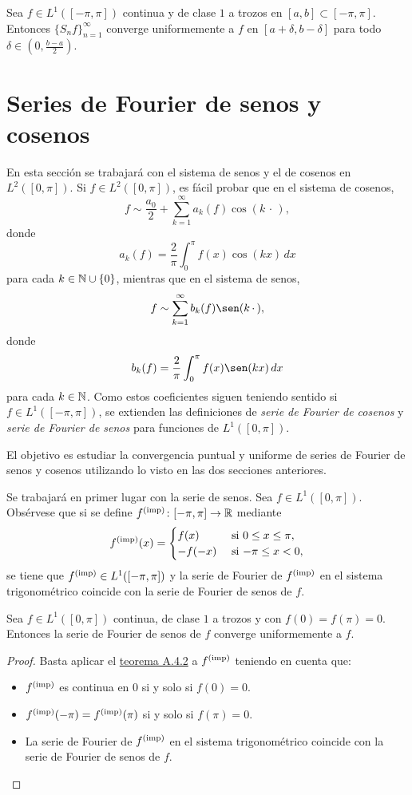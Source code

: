 \documentclass[a4paper, 12pt, extrafontsizes]{memoir}
\begin{document}
\begin{theorem}
    Sea $f \in L^1([-\pi,\pi])$ continua y de clase $1$ a trozos en $[a,b] \subset [-\pi,\pi]$. Entonces $\{S_nf\}_{n=1}^\infty$ converge uniformemente a $f$ en $[a+\delta,b-\delta]$ para todo $\delta \in (0,\frac{b-a}{2})$.
\end{theorem}

\section{Series de Fourier de senos y cosenos}

En esta sección se trabajará con el sistema de senos y el de cosenos en $L^2([0,\pi])$. Si $f \in L^2([0,\pi])$, es fácil probar que en el sistema de cosenos,
\[f \sim \frac{a_0}{2}+\sum_{k=1}^\infty a_k(f)\cos(k \, \cdot \,),\]
donde
\[a_k(f) = \frac{2}{\pi}\int_0^\pi f(x)\cos(kx) \, dx\]
para cada $k \in \mathbb N \cup \{0\}$, mientras que en el sistema de senos,
\[f \sim \sum_{k=1}^\infty b_k(f)\sen(k\, \cdot \,),\]
donde
\[b_k(f) = \frac{2}{\pi}\int_0^\pi f(x)\sen(kx) \, dx\]
para cada $k \in \mathbb N$. Como estos coeficientes siguen teniendo sentido si $f \in L^1([-\pi,\pi])$, se extienden las definiciones de \emph{serie de Fourier de cosenos} y \emph{serie de Fourier de senos} para funciones de $L^1([0,\pi])$.

El objetivo es estudiar la convergencia puntual y uniforme de series de Fourier de senos y cosenos utilizando lo visto en las dos secciones anteriores. 

Se trabajará en primer lugar con la serie de senos. Sea $f \in L^1([0,\pi])$. Obsérvese que si se define $f^{(\textup{imp})} \colon [-\pi,\pi] \to \mathbb R$ mediante
\[f^{(\textup{imp})}(x) = \begin{cases}
    f(x) & $ si $ 0 \leq x \leq \pi, \\
    -f(-x) & $ si $ -\pi \leq x < 0,
\end{cases}\]
se tiene que $f^{(\textup{imp})} \in L^1([-\pi,\pi])$ y la serie de Fourier de $f^{(\textup{imp})}$ en el sistema trigonométrico coincide con la serie de Fourier de senos de $f$.

\begin{corollary}
    Sea $f \in L^1([0,\pi])$ continua, de clase $1$ a trozos y con $f(0) = f(\pi) = 0$. Entonces la serie de Fourier de senos de $f$ converge uniformemente a $f$.
\end{corollary}

\begin{proof}
    Basta aplicar el \hyperref[teo:A.4.2]{\color{gray}teorema A.4.2} a $f^{(\textup{imp})}$ teniendo en cuenta que:
    \begin{itemize}
    \item $f^{(\textup{imp})}$ es continua en 0 si y solo si $f(0) = 0$.
    \item $f^{(\textup{imp})}(-\pi) = f^{(\textup{imp})}(\pi)$ si y solo si $f(\pi) = 0$.
    \item La serie de Fourier de $f^{(\textup{imp})}$ en el sistema trigonométrico coincide con la serie de Fourier de senos de $f$. \qedhere
    \end{itemize} 
\end{proof}
\end{document}
